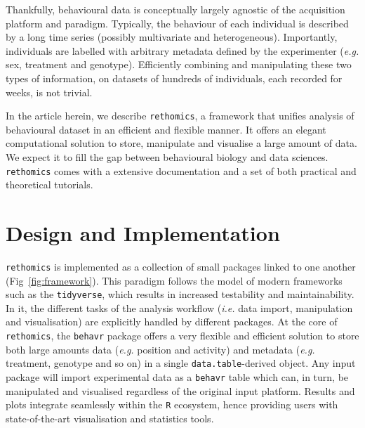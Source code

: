 \documentclass[10pt,letterpaper]{article}
\begin{document}
Thankfully, behavioural data is conceptually largely agnostic of the acquisition platform and paradigm. 	
Typically, the behaviour of each individual is described by a long time series (possibly multivariate and heterogeneous).
Importantly, individuals are labelled with arbitrary metadata defined by the experimenter (\emph{e.g.} sex, treatment and genotype).
Efficiently combining and manipulating these two types of information, on datasets of hundreds of individuals, each recorded for weeks, is not trivial.

In the article herein, we describe \texttt{rethomics}, a framework that unifies analysis of behavioural dataset in an efficient and flexible manner.
It offers an elegant computational solution to store, manipulate and visualise a large amount of data.
We expect it to fill the gap between behavioural biology and data sciences.
\texttt{rethomics} comes with a extensive documentation and a set of both practical and theoretical tutorials.


\section*{Design and Implementation}

\texttt{rethomics} is implemented as a collection of small packages linked to one another (Fig~\ref{fig:framework}).
This paradigm follows the model of modern frameworks such as the \texttt{tidyverse}, which results in increased testability and maintainability.
In it, the different tasks of the analysis workflow (\emph{i.e.} data import, manipulation and visualisation)
are explicitly handled by different packages.
At the core of \texttt{rethomics}, the \texttt{behavr} package offers a very flexible and efficient solution to store both large amounts data (\emph{e.g.} position and activity) and metadata (\emph{e.g.} treatment, genotype and so on) in a single \texttt{data.table}-derived object.
Any input package will import experimental data as a \texttt{behavr} table which can, in turn, be manipulated and visualised regardless of the original input platform.
Results and plots integrate seamlessly within the \texttt{R} ecosystem, hence providing users with state-of-the-art visualisation and statistics tools.

\end{document}
